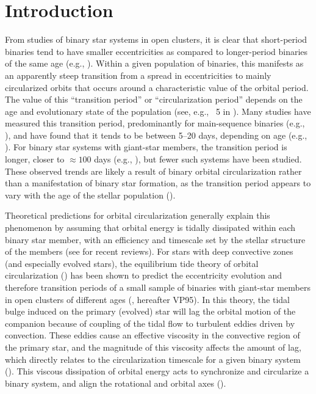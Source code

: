 \documentclass[modern, letterpaper]{aastex62}
\begin{document}

\section{Introduction} \label{sec:intro}

From studies of binary star systems in open clusters, it is clear that
short-period binaries tend to have smaller eccentricities as compared to
longer-period binaries of the same age (e.g., \citealt{Mathieu:2005}).
Within a given population of binaries, this manifests as an apparently steep transition from a spread in eccentricities to mainly circularized orbits that occurs around a characteristic value of the orbital period.
The value of this ``transition period'' or ``circularization period'' depends on the age and evolutionary state of the population (see, e.g., \figurename~5 in \citealt{Mathieu:2005}).
Many studies have measured this transition period, predominantly for main-sequence binaries (e.g., \citealt{Latham:2002, Meibom:2006, Kjurkchieva:2017}), and have found that it tends to be between 5--20 days, depending on age (e.g., \citealt{Mathieu:1988}).
For binary star systems with giant-star members, the transition period is longer, closer to $\approx 100$ days (e.g., \citealt{Mayor:1984, Bluhm:2016}), but fewer such systems have been studied.
These observed trends are likely a result of binary orbital circularization rather than a manifestation of binary star formation, as the transition period appears to vary with the age of the stellar population (\citealt{Meibom:2005}).

Theoretical predictions for orbital circularization generally explain this phenomenon by assuming that orbital energy is tidally dissipated within each binary star member, with an efficiency and timescale set by the stellar structure of the members (see \citealt{Mazeh:2007hp, Zahn:2008} for recent reviews).
For stars with deep convective zones (and especially evolved stars), the equilibrium tide theory of orbital circularization (\citealt{Zahn:1977, Zahn:1989}) has been shown to predict the eccentricity evolution and therefore transition periods of a small sample of binaries with giant-star members in open clusters of different ages (\citealt{Verbunt:1995}, hereafter VP95).
In this theory, the tidal bulge induced on the primary (evolved) star will lag
the orbital motion of the companion because of coupling of the tidal flow to
turbulent eddies driven by convection.
These eddies cause an effective viscosity in the convective region of the
primary star, and the magnitude of this viscosity affects the amount of lag,
which directly relates to the circularization timescale for a given binary
system (\citealt{Zahn:1989}).
This viscous dissipation of orbital energy acts to synchronize and circularize a
binary system, and align the rotational and orbital axes (\citealt{Zahn:1977,
Zahn:1989}).
\end{document}
